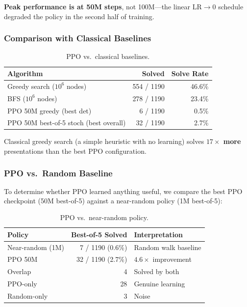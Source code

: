 \documentclass[11pt,a4paper]{article}
\begin{document}
\textbf{Peak performance is at 50M steps}, not 100M---the linear LR$\to$0
schedule degraded the policy in the second half of training.

\subsubsection{Comparison with Classical Baselines}

\begin{table}[h]
\centering
\caption{PPO vs.\ classical baselines.}
\label{tab:ppo-vs-classical}
\begin{tabular}{lrr}
  \toprule
  \textbf{Algorithm} & \textbf{Solved} & \textbf{Solve Rate} \\
  \midrule
  Greedy search ($10^6$ nodes)           & 554 / 1190 & 46.6\% \\
  BFS ($10^6$ nodes)                     & 278 / 1190 & 23.4\% \\
  PPO 50M greedy (best det)              & 6 / 1190   & 0.5\%  \\
  PPO 50M best-of-5 stoch (best overall) & 32 / 1190  & 2.7\%  \\
  \bottomrule
\end{tabular}
\end{table}

Classical greedy search (a simple heuristic with no learning) solves
\textbf{$17\times$ more} presentations than the best PPO configuration.

\subsubsection{PPO vs.\ Random Baseline}

To determine whether PPO learned anything useful, we compare the best PPO
checkpoint (50M best-of-5) against a near-random policy (1M best-of-5):

\begin{table}[h]
\centering
\caption{PPO vs.\ near-random policy.}
\label{tab:ppo-vs-random}
\begin{tabular}{lrl}
  \toprule
  \textbf{Policy} & \textbf{Best-of-5 Solved} & \textbf{Interpretation} \\
  \midrule
  Near-random (1M)   & 7 / 1190 (0.6\%)  & Random walk baseline \\
  PPO 50M            & 32 / 1190 (2.7\%) & $4.6\times$ improvement \\
  Overlap            & 4                  & Solved by both \\
  PPO-only           & 28                 & Genuine learning \\
  Random-only        & 3                  & Noise \\
  \bottomrule
\end{tabular}
\end{table}
\end{document}

